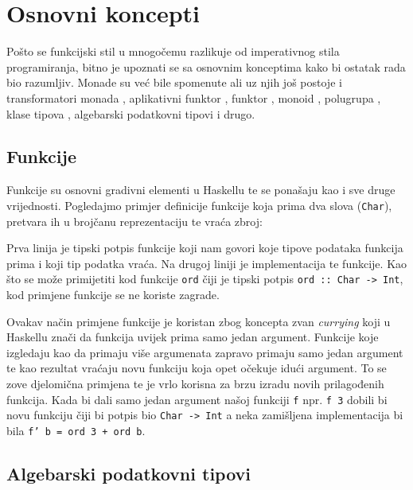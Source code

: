 \section{Osnovni koncepti}

Pošto se funkcijski stil u mnogočemu razlikuje od imperativnog stila programiranja, bitno je upoznati se sa osnovnim konceptima kako bi ostatak rada bio razumljiv. Monade su već bile spomenute ali uz njih još postoje i transformatori monada , aplikativni funktor , funktor , monoid , polugrupa , klase tipova , algebarski podatkovni tipovi  i drugo.

\subsection{Funkcije}

Funkcije su osnovni gradivni elementi u Haskellu te se ponašaju kao i sve druge vrijednosti. Pogledajmo primjer definicije funkcije koja prima dva slova (\texttt{Char}), pretvara ih u brojčanu reprezentaciju te vraća zbroj:


Prva linija je tipski potpis  funkcije koji nam govori koje tipove podataka funkcija prima i koji tip podatka vraća. Na drugoj liniji je implementacija te funkcije. Kao što se može primijetiti kod funkcije \texttt{ord} čiji je tipski potpis \texttt{ord :: Char -> Int}, kod primjene funkcije se ne koriste zagrade.

Ovakav način primjene funkcije je koristan zbog koncepta zvan \textit{currying} koji u Haskellu znači da funkcija uvijek prima samo jedan argument. Funkcije koje izgledaju kao da primaju više argumenata zapravo primaju samo jedan argument te kao rezultat vraćaju novu funkciju koja opet očekuje idući argument. To se zove djelomična primjena  te je vrlo korisna za brzu izradu novih prilagođenih funkcija. Kada bi dali samo jedan argument našoj funkciji \texttt{f} npr. \texttt{f 3} dobili bi novu funkciju čiji bi potpis bio \texttt{Char -> Int} a neka zamišljena implementacija bi bila \texttt{f' b = ord 3 + ord b}.

\subsection{Algebarski podatkovni tipovi}

